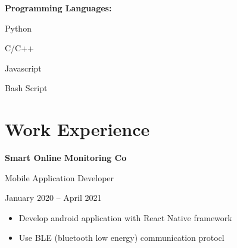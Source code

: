 \documentclass[11pt]{article}
\begin{document}
\noindent \textbf{Programming Languages:}
\begin{itemize}
    \setlength\itemsep{0em}
    \begin{multicols}{2}
        \item {Python}
        \item {C/C++}
        \item {Javascript}
        \item {Bash Script}
    \end{multicols}
\end{itemize}



\section {Work Experience}
\noindent \textbf{Smart Online Monitoring Co} \par
Mobile Application Developer \par
January 2020 – April 2021 \par
\begin{itemize}
    \item Develop android application with React Native framework
    \item Use BLE (bluetooth low energy) communication protocl
\end{itemize}
\vspace{15pt}
\end{document}
